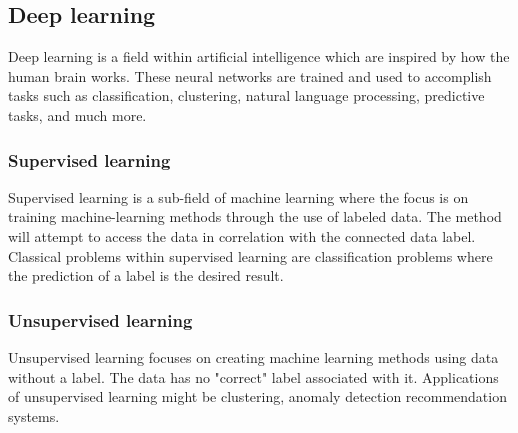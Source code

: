 \subsection{Deep learning}

Deep learning is a field within artificial intelligence which are inspired by how the human brain works.
These neural networks are trained and used to accomplish tasks such as classification, clustering, natural language processing, predictive tasks, and much more.

\subsubsection{Supervised learning}
Supervised learning is a sub-field of machine learning where the focus is on training
machine-learning methods through the use of labeled data.
The method will attempt to access the data in correlation with the connected data label.
Classical problems within supervised learning are classification problems where the prediction of a label is the desired result.

\subsubsection{Unsupervised learning}
Unsupervised learning focuses on creating machine learning methods using data without a label.
The data has no "correct" label associated with it.
Applications of unsupervised learning might be clustering, anomaly detection recommendation systems.

